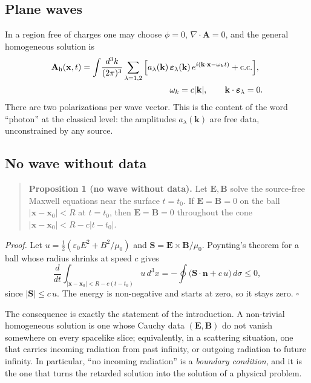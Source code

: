 \subsection{Plane waves}

In a region free of charges one may choose $\phi=0$, $\nabla\cdot\mathbf A=0$,
and the general homogeneous solution is
\begin{equation}
\begin{split}
\mathbf A_{\rm h}(\mathbf x,t)=\int\!\frac{d^3k}{(2\pi)^3}\sum_{\lambda=1,2}
\Big[a_\lambda(\mathbf k)\,&\boldsymbol\varepsilon_\lambda(\mathbf k)\,
e^{i(\mathbf k\cdot\mathbf x-\omega_k t)}+\text{c.c.}\Big],\\
&\omega_k=c|\mathbf k|,\qquad
\mathbf k\cdot\boldsymbol\varepsilon_\lambda=0 .
\end{split}
\label{eq:mb-modes}
\end{equation}
There are two polarizations per wave vector. This is the content of the
word ``photon'' at the classical level: the amplitudes $a_\lambda(\mathbf k)$
are free data, unconstrained by any source.

\subsection{No wave without data}

\begin{quote}
\textbf{Proposition 1 (no wave without data).} Let $\mathbf E,\mathbf B$
solve the source-free Maxwell equations near the surface $t=t_0$. If
$\mathbf E=\mathbf B=0$ on the ball $|\mathbf x-\mathbf x_0|<R$ at $t=t_0$,
then $\mathbf E=\mathbf B=0$ throughout the cone
$|\mathbf x-\mathbf x_0|<R-c|t-t_0|$.
\end{quote}

\emph{Proof.} Let $u=\tfrac12(\varepsilon_0E^2+B^2/\mu_0)$ and
$\mathbf S=\mathbf E\times\mathbf B/\mu_0$. Poynting's theorem for a ball
whose radius shrinks at speed $c$ gives
\begin{equation}
\frac{d}{dt}\int_{|\mathbf x-\mathbf x_0|<R-c(t-t_0)}\!\! u\,d^3x
=-\oint\big(\mathbf S\cdot\mathbf n+c\,u\big)\,d\sigma\le0,
\end{equation}
since $|\mathbf S|\le c\,u$. The energy is non-negative and starts at zero,
so it stays zero. $\square$

The consequence is exactly the statement of the introduction. A non-trivial
homogeneous solution is one whose Cauchy data $(\mathbf E,\mathbf B)$ do
not vanish somewhere on every spacelike slice; equivalently, in a
scattering situation, one that carries incoming radiation from past
infinity, or outgoing radiation to future infinity. In particular, ``no
incoming radiation'' is a \emph{boundary condition}, and it is the one
that turns the retarded solution into the solution of a physical problem.

